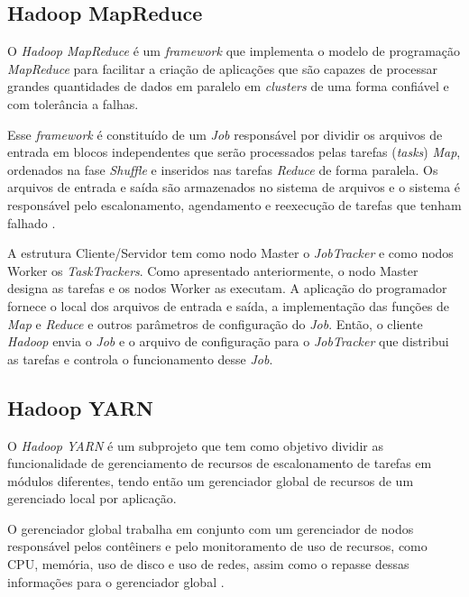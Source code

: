 \subsection{Hadoop MapReduce} \label{ssec:hadoopmapreduce}

O \textit{Hadoop MapReduce} é um \textit{framework} que implementa o modelo de programação \textit{MapReduce} para facilitar a criação de aplicações que são capazes de processar grandes quantidades de dados em paralelo em \textit{clusters} de uma forma confiável e com tolerância a falhas. 

Esse \textit{framework} é constituído de um \textit{Job} responsável por dividir os arquivos de entrada em blocos independentes que serão processados pelas tarefas (\textit{tasks}) \textit{Map}, ordenados na fase \textit{Shuffle} e inseridos nas tarefas \textit{Reduce} de forma paralela. Os arquivos de entrada e saída são armazenados no sistema de arquivos e o sistema é responsável pelo escalonamento, agendamento e reexecução de tarefas que tenham falhado \cite{HadoopMapReduce22}.

A estrutura Cliente/Servidor tem como nodo Master o \textit{JobTracker} e como nodos Worker os \textit{TaskTrackers}. Como apresentado anteriormente, o nodo Master designa as tarefas e os nodos Worker as executam. A aplicação do programador fornece o local dos arquivos de entrada e saída, a implementação das funções de \textit{Map} e \textit{Reduce} e outros parâmetros de configuração do \textit{Job}. Então, o cliente \textit{Hadoop} envia o \textit{Job} e o arquivo de configuração para o \textit{JobTracker} que distribui as tarefas e controla o funcionamento desse \textit{Job}.

\subsection{Hadoop YARN} \label{ssec:hadoopyarn}

O \textit{Hadoop YARN} é um subprojeto que tem como objetivo dividir as funcionalidade de gerenciamento de recursos de escalonamento de tarefas em módulos diferentes, tendo então um gerenciador global de recursos de um gerenciado local por aplicação. 

O gerenciador global trabalha em conjunto com um gerenciador de nodos responsável pelos contêiners e pelo monitoramento de uso de recursos, como CPU, memória, uso de disco e uso de redes, assim como o repasse dessas informações para o gerenciador global \cite{HadoopYarn22}.

